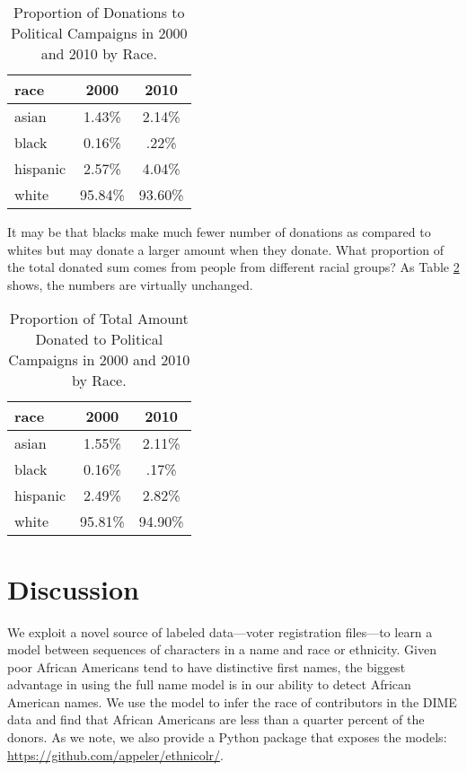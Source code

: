 \documentclass[12pt, letterpaper]{article}
\begin{document}
\begin{table}[h!]
\centering
\caption{Proportion of Donations to Political Campaigns in 2000 and 2010 by Race.}
\begin{tabular}{ l c  c}
\hline    
race & 2000  & 2010 \\    
\hline
asian &     1.43\%  & 2.14\%\\
black &     0.16\%  & .22\%\\
hispanic &     2.57\%  & 4.04\%\\
white &     95.84\%  & 93.60\%\\
\hline
\end{tabular}
\label{table:percentage_donations_by_race}
\end{table}

It may be that blacks make much fewer number of donations as compared to whites but may donate a larger amount when they donate. What proportion of the total donated sum comes from people from different racial groups? As Table \ref{table:percentage_contrib_by_race} shows, the numbers are virtually unchanged. 

\begin{table}[h!]
\centering
\caption{Proportion of Total Amount Donated to Political Campaigns in 2000 and 2010 by Race.}
\begin{tabular}{ l c  c}
\hline    
race & 2000  & 2010 \\    
\hline
asian &     1.55\%  & 2.11\%\\
black &     0.16\%  & .17\%\\
hispanic &     2.49\%  & 2.82\%\\
white &     95.81\%  & 94.90\%\\
\hline
\end{tabular}
\label{table:percentage_contrib_by_race}
\end{table}

\section*{Discussion}
We exploit a novel source of labeled data---voter registration files---to learn a model between sequences of characters in a name and race or ethnicity. Given poor African Americans tend to have distinctive first names, the biggest advantage in using the full name model is in our ability to detect African American names. We use the model to infer the race of contributors in the DIME data and find that African Americans are less than a quarter percent of the donors. As we note, we also provide a Python package that exposes the models: \url{https://github.com/appeler/ethnicolr/}.
\end{document}
